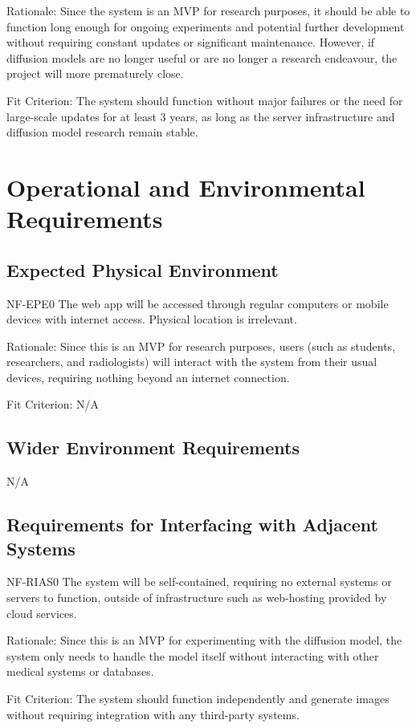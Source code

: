 \documentclass[12pt]{article}
\begin{document}
Rationale: Since the system is an MVP for research purposes, it should be able to function long 
enough for ongoing experiments and potential further development without requiring constant 
updates or significant maintenance. However, if diffusion models are no longer useful or are no 
longer a research endeavour, the project will more prematurely close.

Fit Criterion: The system should function without major failures or the need for large-scale 
updates for at least 3 years, as long as the server infrastructure and diffusion model research 
remain stable.


\section{Operational and Environmental Requirements}
\subsection{Expected Physical Environment}
NF-EPE0 The web app will be accessed through regular computers or mobile devices with internet 
access. Physical location is irrelevant.

Rationale: Since this is an MVP for research purposes, users (such as students, researchers, and 
radiologists) will interact with the system from their usual devices, requiring nothing beyond an 
internet connection.

Fit Criterion: N/A

\subsection{Wider Environment Requirements}
N/A


\subsection{Requirements for Interfacing with Adjacent Systems}
NF-RIAS0 The system will be self-contained, requiring no external systems or servers to function, 
outside of infrastructure such as web-hosting provided by cloud services.

Rationale: Since this is an MVP for experimenting with the diffusion model, the system only needs
 to handle the model itself without interacting with other medical systems or databases.

Fit Criterion: The system should function independently and generate images without requiring 
integration with any third-party systems.
\end{document}
